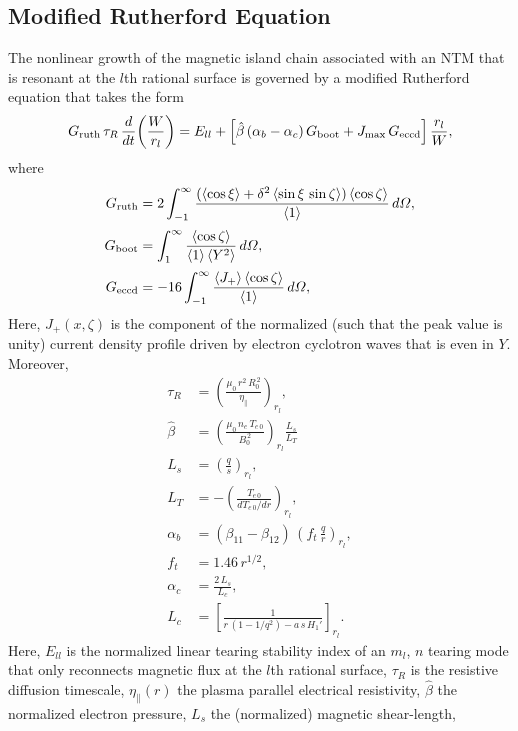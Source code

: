 \documentclass[12pt,prb,aps]{revtex4-1}
\begin{document}
\subsection{Modified Rutherford Equation}
The nonlinear growth of the magnetic island  chain associated with an NTM that is resonant at the $l$th rational surface is governed by a modified Rutherford equation that takes the form\,\cite{ntm1,ntm4,island,boot,fitz}
\begin{equation}\label{eruth}
G_{\rm ruth}\,\tau_R\,\frac{d}{dt}\!\left(\frac{W}{r_l}\right) = E_{ll} +\left[\hat{\beta}\,(\alpha_b-\alpha_c)\,G_{\rm boot} + J_{\rm max}\,G_{\rm eccd}\right]
\frac{r_l}{W},
\end{equation}
where
\begin{align}
G_{\rm ruth} &= 2\int_{-1}^\infty \frac{(\langle\cos\xi\rangle + \delta^2\,\langle \sin\xi\,\sin\zeta\rangle)\,\langle \cos\zeta\rangle}{\langle 1\rangle}\,d{\mit\Omega},\\[0.5ex]
G_{\rm boot} &= \int_1^\infty \frac{\langle \cos\zeta\rangle}{\langle 1\rangle\,\langle Y^2\rangle}\,d{\mit\Omega},\\[0.5ex]
G_{\rm eccd} &= - 16\int_{-1}^\infty \frac{\langle J_+\rangle\,\langle \cos\zeta\rangle}{\langle 1\rangle}\,d{\mit\Omega},\label{geccd}
\end{align}
Here,  $J_+(x,\zeta)$ is the component of the normalized  (such that the peak value is unity) current density profile driven by electron cyclotron waves that is even in $Y$. 
Moreover, 
\begin{align}
\tau_R &= \left(\frac{\mu_0\,r^2\,R_0^{\,2}}{\eta_\parallel}\right)_{r_l},\\[0.5ex]
\hat{\beta} &= \left(\frac{\mu_0\,n_e\,T_{e\,0}}{B_0^{\,2}}\right)_{r_l}\frac{L_s}{L_T}\,\\[0.5ex]
L_s&=\left(\frac{q}{s}\right)_{r_l},\\[0.5ex]
L_T &= -\left(\frac{T_{e\,0}}{dT_{e\,0}/dr}\right)_{r_l},\\[0.5ex]
\alpha_b &=(\beta_{11}-\beta_{12})\, \left(f_t\,\frac{q}{r}\right)_{r_l},\\[0.5ex]
f_t&= 1.46\,r^{1/2},\\[0.5ex]
\alpha_c &= \frac{2\,L_s}{L_c},\\[0.5ex]
L_c &= \left[\frac{1}{r\,(1-1/q^2) -a\,s\,H_1'}\right]_{r_l}.
\end{align}
Here, $E_{ll}$ is the  normalized linear tearing stability index of an $m_l$, $n$ tearing mode
 that only reconnects magnetic flux at the $l$th rational surface,\cite{tear5} $\tau_R$ is the resistive diffusion timescale, $\eta_\parallel(r)$  the plasma parallel electrical resistivity, $\hat{\beta}$ the normalized electron pressure, $L_s$  the (normalized) magnetic shear-length, 
\end{document}
